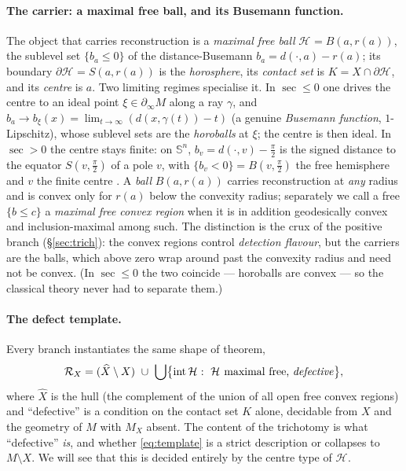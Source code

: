 \documentclass[11pt]{article}
\theoremstyle{remark}
\newcommand{\X}{X}
\newcommand{\Xhat}{\widehat{\X}}
\newcommand{\Mx}{M_{\X}}
\newcommand{\Rx}{\mathcal{R}_{\X}}
\newcommand{\Hb}[1]{\mathcal{H}_{#1}}
\newcommand{\sect}{\operatorname{sec}}
\newcommand{\bdry}{\partial_{\infty}}
\newcommand{\Sn}{\mathbb{S}^{n}}
\begin{document}
\paragraph{The carrier: a maximal free ball, and its Busemann function.}
The object that carries reconstruction is a \emph{maximal free ball}
$\Hb{}=B(a,r(a))$, the sublevel set $\{b_{a}\le0\}$ of the
distance-Busemann $b_{a}=d(\cdot,a)-r(a)$; its boundary
$\partial\Hb{}=S(a,r(a))$ is the \emph{horosphere}, its \emph{contact set}
is $K=\X\cap\partial\Hb{}$, and its \emph{centre} is $a$. Two limiting
regimes specialise it. In $\sect\le0$ one drives the centre to an ideal
point $\xi\in\bdry M$ along a ray $\gamma$, and $b_{a}\to b_{\xi}(x)=
\lim_{t\to\infty}(d(x,\gamma(t))-t)$ (a genuine \emph{Busemann function},
$1$-Lipschitz), whose sublevel sets are the \emph{horoballs} at $\xi$; the
centre is then ideal. In $\sect>0$ the centre stays finite: on $\Sn$,
$b_{v}=d(\cdot,v)-\tfrac\pi2$ is the signed distance to the equator
$S(v,\tfrac\pi2)$ of a pole $v$, with $\{b_{v}<0\}=B(v,\tfrac\pi2)$ the free
hemisphere and $v$ the finite centre \cite[\S2,\S9]{Sph}. A
\emph{ball} $B(a,r(a))$ carries reconstruction at \emph{any} radius and is
convex only for $r(a)$ below the convexity radius; separately we call a
free $\{b\le c\}$ a \emph{maximal free convex region} when it is in
addition geodesically convex and inclusion-maximal among such. The
distinction is the crux of the positive branch (\S\ref{sec:trich}): the
convex regions control \emph{detection flavour}, but the carriers are the
balls, which above zero wrap around past the convexity radius and need not
be convex. (In $\sect\le0$ the two coincide --- horoballs are convex --- so
the classical theory never had to separate them.)

\paragraph{The defect template.} Every branch instantiates the same shape
of theorem,
\begin{equation}\label{eq:template}
  \Rx=(\Xhat\setminus\X)\ \cup\
  \bigcup\bigl\{\operatorname{int}\Hb{}:\ \Hb{}\ \text{maximal free,
  \emph{defective}}\bigr\},
\end{equation}
where $\Xhat$ is the hull (the complement of the union of all open free
convex regions) and ``defective'' is a condition on the contact set $K$
alone, decidable from $\X$ and the geometry of $M$ with $\Mx$ absent. The
content of the trichotomy is what ``defective'' \emph{is}, and whether
\eqref{eq:template} is a strict description or collapses to
$M\setminus\X$. We will see that this is decided entirely by the centre
type of $\Hb{}$.
\end{document}
